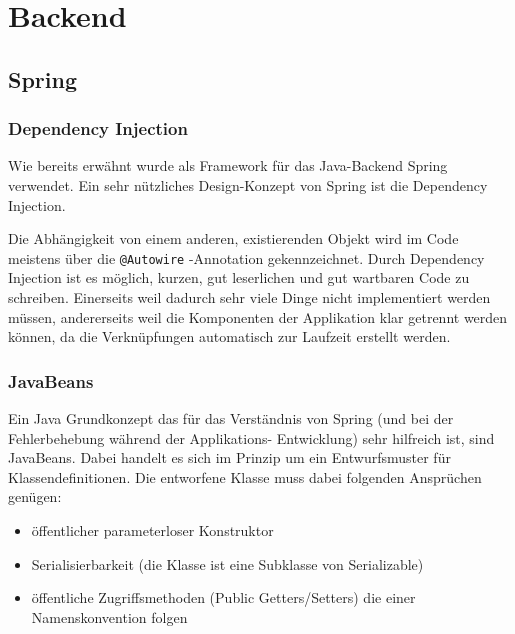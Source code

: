 \section{Backend}

\subsection{Spring}

\subsubsection{Dependency Injection}

Wie bereits erwähnt wurde als Framework für das Java-Backend Spring verwendet. Ein sehr nützliches Design-Konzept von Spring ist die Dependency Injection.


Die Abhängigkeit von einem anderen, existierenden Objekt wird im Code meistens über die \verb|@Autowire| -Annotation gekennzeichnet. Durch Dependency Injection ist es möglich, kurzen, gut leserlichen und gut wartbaren Code zu schreiben. Einerseits weil dadurch sehr viele Dinge nicht implementiert werden müssen, andererseits weil die Komponenten der Applikation klar getrennt werden können, da die Verknüpfungen automatisch zur Laufzeit erstellt werden.

\subsubsection{JavaBeans}
Ein Java Grundkonzept das für das Verständnis von Spring (und bei der Fehlerbehebung während der Applikations- Entwicklung) sehr hilfreich ist, sind JavaBeans. Dabei handelt es sich im Prinzip um ein Entwurfsmuster für Klassendefinitionen. Die entworfene Klasse muss dabei folgenden Ansprüchen genügen:

\begin{itemize}
	\item öffentlicher parameterloser Konstruktor
	\item Serialisierbarkeit (die Klasse ist eine Subklasse von Serializable)
	\item öffentliche Zugriffsmethoden (Public Getters/Setters) die einer Namenskonvention folgen
\end{itemize}

